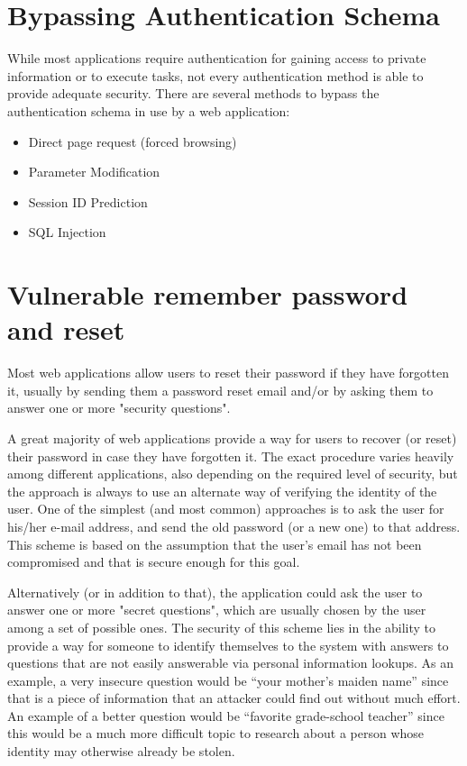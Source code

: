 \section{Bypassing Authentication Schema}

	While most applications require authentication for gaining access to private information or 
	to execute tasks, not every authentication method is able to provide adequate security.
	There are several methods to bypass the authentication schema in use by a web application:
		\begin{itemize}
			\item Direct page request (forced browsing)
			\item Parameter Modification
			\item Session ID Prediction
			\item SQL Injection
		\end{itemize}


\section{Vulnerable remember password and reset}
	Most web applications allow users to reset their password if they have forgotten it, usually 
	by sending them a password reset email and/or by asking them to answer one or more 
	"security questions".

	A great majority of web applications provide a way for users to recover (or reset) their password 
	in case they have forgotten it. The exact procedure varies heavily among different applications, 
	also depending on the required level of security, but the approach is always to use an alternate 
	way of verifying the identity of the user. One of the simplest (and most common) approaches is 
	to ask the user for his/her e-mail address, and send the old password (or a new one) to that
	address. This scheme is based on the assumption that the user's email has not been compromised 
	and that is secure enough for this goal.

	Alternatively (or in addition to that), the application could ask the user to answer one or more 
	"secret questions", which are usually chosen by the user among a set of possible ones. 
	The security of this scheme lies in the ability to provide a way for someone to identify themselves 
	to the system with answers to questions that are not easily answerable via personal information 
	lookups. As an example, a very insecure question would be “your mother’s maiden name” since that 
	is a piece of information that an attacker could find out without much effort. An example of a 
	better question would be “favorite grade-school teacher” since this would be a much more difficult 
	topic to research about a person whose identity may otherwise already be stolen.

